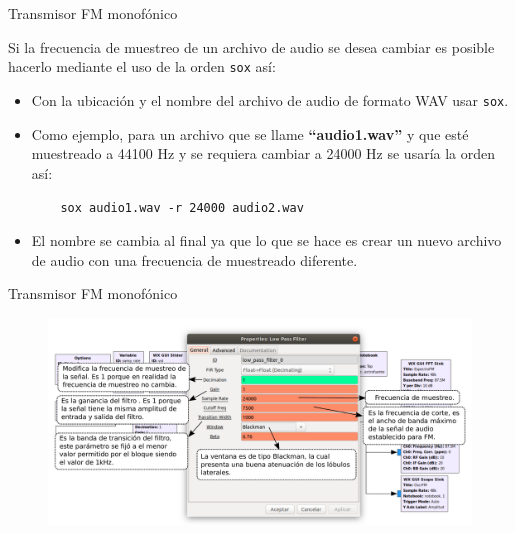 \begin{frame}{Transmisor FM monofónico}

Si la frecuencia de muestreo de un archivo de audio se desea cambiar es posible hacerlo mediante el uso de la orden \texttt{sox} así:

\begin{itemize}
    \item {Con la ubicación y el nombre del archivo de audio de formato WAV usar \texttt{sox}.}
    \item {Como ejemplo, para un archivo que se llame \textbf{“audio1.wav”} y que esté muestreado a 44100 Hz y se requiera cambiar a 24000 Hz se usaría la orden así:
     \begin{block}{}
    \texttt{
    \ \ \ sox audio1.wav -r 24000 audio2.wav  }
    \end{block}}
    \item {El nombre se cambia al final ya que lo que se hace es crear un nuevo archivo de audio con una frecuencia de muestreado diferente.  
}
   
    
\end{itemize}{}

\end{frame}

\begin{frame}{Transmisor FM monofónico}

\begin{figure}[H]
\centering
\vspace{-3mm}
\includegraphics[width=1.1\textwidth]{parte3/lab11/pdf/lab11_5.pdf}
\end{figure}

\end{frame}

